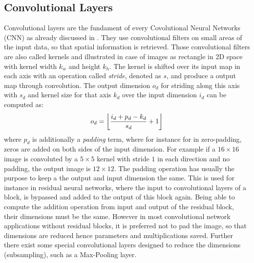 \subsection{Convolutional Layers}\label{sec:nn_theory_cnn}
Convolutional layers are the fundament of every Covolutional Neural Networks (CNN) as already discussed in .
They use convolutional filters on small areas of the input data, so that spatial information is retrieved.
Those convolutional filters are also called kernels and illustrated in case of images as rectangle in 2D space with kernel width $k_w$ and height $k_h$.
The kernel is shifted over its input map in each axis with an operation called \emph{stride}, denoted as $s$, and produce a output map through convolution.
The output dimension $o_d$ for striding along this axis with $s_d$ and kernel size for that axis $k_d$ over the input dimension $i_d$ can be computed as:
\begin{equation}\label{eq:nn_theory_cnn_}
  o_d = \floor*{\frac{i_d + p_d - k_d}{s_d} + 1}
\end{equation}
where $p_d$ is additionally a \emph{padding} term, where for instance for in zero-padding, zeros are added on both sides of the input dimension.
For example if a $16 \times 16$ image is convoluted by a $5 \times 5$ kernel with stride $1$ in each direction and no padding, the output image is $12 \times 12$.
The padding operation has usually the purpose to keep a the output and input dimension the same.
This is used for instance in residual neural networks, where the input to convolutional layers of a block, is bypassed and added to the output of this block again.
Being able to compute the addition operation from input and output of the residual block, their dimensions must be the same.
However in most convolutional network applications without residual blocks, it is preferred not to pad the image, so that dimensions are reduced hence parameters and multiplications saved.
Further there exist some special convolutional layers designed to reduce the dimensions (subsampling), such as a Max-Pooling layer. 

